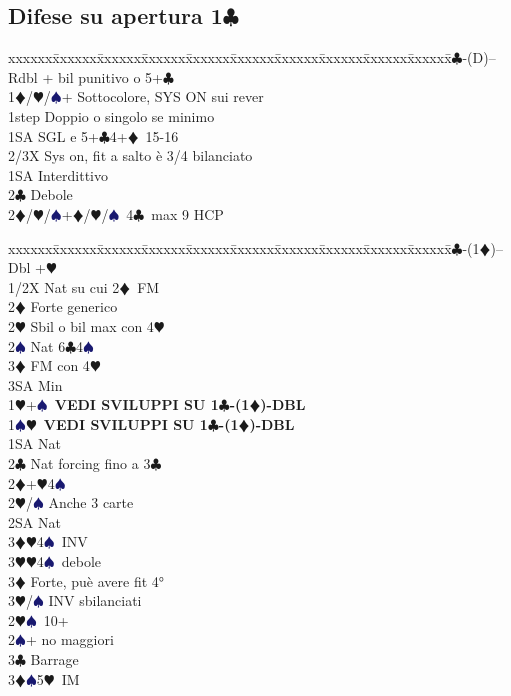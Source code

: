 \documentclass[a4paper,italian]{article}
\newcommand{\BC}{\textcolor{OliveGreen}{$\clubsuit$}}
\newcommand{\BD}{\textcolor{RedOrange}{$\vardiamondsuit$}}
\newcommand{\BH}{\textcolor{Red2}{$\varheartsuit${}}}
\newcommand{\BS}{\textcolor{MidnightBlue}{$\spadesuit${}}}
\newcommand{\pdfc}{\texorpdfstring{\BC{}}{C}}
\newenvironment{bidtable}
{\begin{tabbing}

    xxxxxx\=xxxxxx\=xxxxxx\=xxxxxx\=xxxxxx\=xxxxxx\=xxxxxx\=xxxxxx\=xxxxxx\=xxxxxx\=\kill}
{\end{tabbing} }%
\begin{document}
\begin{multicols}{2}

    \subsection{Difese su apertura 1\pdfc}

    \begin{bidtable}
        1\BC-(D)--\+\\
        Rdbl + bil punitivo o 5+\BC \\
        1\BD/\BH/\BS {}+ Sottocolore, SYS ON sui rever\+\\
        1step \> Doppio o singolo se minimo\\
        1SA \> SGL e 5+\BC 4+\BD\ 15-16\\
        2/3X \> Sys on, fit a salto è 3/4 bilanciato\-\\
        1SA \> Interdittivo\\
        2\BC \> Debole\\
        2\BD/\BH/\BS {}+\BD/\BH/\BS\ 4\BC\ max 9 HCP\-
    \end{bidtable}

    \begin{bidtable}
        1\BC-(1\BD)--\+\\
        Dbl +\BH \+\\
        1/2X \> Nat su cui 2\BD\ FM\\
        2\BD \> Forte generico\\
        2\BH \> Sbil o bil max con 4\BH \\
        2\BS \> Nat 6\BC 4\BS \\
        3\BD \> FM con 4\BH \+\\
        3SA \> Min\-\-\\
        1\BH {}+\BS\ \textbf{VEDI SVILUPPI SU 1\BC -(1\BD )-DBL}\\
        1\BS {}\BH\ \textbf{VEDI SVILUPPI SU 1\BC -(1\BD )-DBL}\\
        1SA \> Nat\\
        2\BC \> Nat forcing fino a 3\BC \\
        2\BD {}+\BH 4\BS \+\\
        2\BH/\BS \> Anche 3 carte\\
        2SA \> Nat\+\\
        3\BD {}\BH 4\BS\ INV\\
        3\BH {}\BH 4\BS\ debole\-\\
        3\BD \> Forte, puè avere fit 4°\\
        3\BH/\BS \> INV sbilanciati\-\\
        2\BH {}\BS\ 10+\\
        2\BS {}+ no maggiori\\
        3\BC \> Barrage\\
        3\BD {}\BS 5\BH\ IM\-
    \end{bidtable}


\end{multicols}
\end{document}
